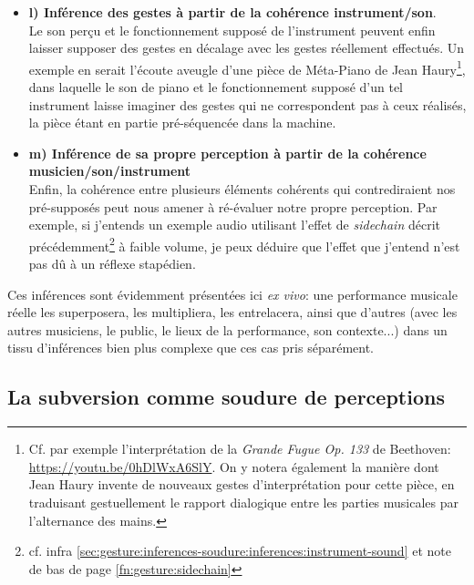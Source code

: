 \begin{itemize}[noitemsep]
	\item \textbf{l) Inférence des gestes à partir de la cohérence instrument/son}.\\
	Le son perçu et le fonctionnement supposé de l'instrument peuvent enfin laisser supposer des gestes en décalage avec les gestes réellement effectués. Un exemple en serait l'écoute aveugle d'une pièce de Méta-Piano de Jean Haury\footnote{Cf. par exemple l'interprétation de la \textit{Grande Fugue Op. 133} de Beethoven: \url{https://youtu.be/0hDlWxA6SlY}. On y notera également la manière dont Jean Haury invente de nouveaux gestes d'interprétation pour cette pièce, en traduisant gestuellement le rapport dialogique entre les parties musicales par l'alternance des mains.}, dans laquelle le son de piano et le fonctionnement supposé d'un tel instrument laisse imaginer des gestes qui ne correspondent pas à ceux réalisés, la pièce étant en partie pré-séquencée dans la machine.
	\item \textbf{m) Inférence de sa propre perception à partir de la cohérence musicien/son/instrument}\\
	Enfin, la cohérence entre plusieurs éléments cohérents qui contrediraient nos pré-supposés peut nous amener à ré-évaluer notre propre perception. Par exemple, si j'entends un exemple audio utilisant l'effet de \textit{sidechain} décrit précédemment\footnote{cf. infra \ref{sec:gesture:inferences-soudure:inferences:instrument-sound} et note de bas de page \ref{fn:gesture:sidechain}} à faible volume, je peux déduire que l'effet que j'entend n'est pas dû à un réflexe stapédien.
\end{itemize}

\noindent Ces inférences sont évidemment présentées ici \textit{ex vivo}: une performance musicale réelle les superposera, les multipliera, les entrelacera, ainsi que d'autres (avec les autres musiciens, le public, le lieux de la performance, son contexte...) dans un tissu d'inférences bien plus complexe que ces cas pris séparément.


\subsection{La subversion comme soudure de perceptions}

